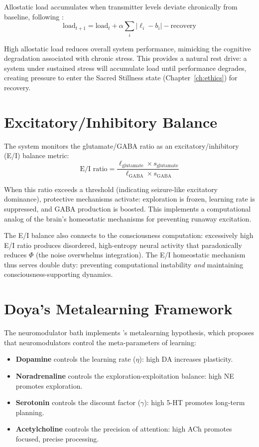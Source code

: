 \documentclass[12pt]{book}
\begin{document}
Allostatic load accumulates when transmitter levels deviate chronically from baseline, following \citet{mcewen1998}:
\begin{equation}\label{eq:allostatic}
\text{load}_{t+1} = \text{load}_t + \alpha \sum_i |\ell_i - b_i| - \text{recovery}
\end{equation}

High allostatic load reduces overall system performance, mimicking the cognitive degradation associated with chronic stress. This provides a natural rest drive: a system under sustained stress will accumulate load until performance degrades, creating pressure to enter the Sacred Stillness state (Chapter~\ref{ch:ethics}) for recovery.

\section{Excitatory/Inhibitory Balance}

The system monitors the glutamate/GABA ratio as an excitatory/inhibitory (E/I) balance metric:
\begin{equation}
\text{E/I ratio} = \frac{\ell_{\text{glutamate}} \times s_{\text{glutamate}}}{\ell_{\text{GABA}} \times s_{\text{GABA}}}
\end{equation}

When this ratio exceeds a threshold (indicating seizure-like excitatory dominance), protective mechanisms activate: exploration is frozen, learning rate is suppressed, and GABA production is boosted. This implements a computational analog of the brain's homeostatic mechanisms for preventing runaway excitation.

The E/I balance also connects to the consciousness computation: excessively high E/I ratio produces disordered, high-entropy neural activity that paradoxically reduces $\Phi$ (the noise overwhelms integration). The E/I homeostatic mechanism thus serves double duty: preventing computational instability \textit{and} maintaining consciousness-supporting dynamics.

\section{Doya's Metalearning Framework}

The neuromodulator bath implements \citet{doya2002metalearning}'s metalearning hypothesis, which proposes that neuromodulators control the meta-parameters of learning:

\begin{itemize}
  \item \textbf{Dopamine} controls the learning rate ($\eta$): high DA increases plasticity.
  \item \textbf{Noradrenaline} controls the exploration-exploitation balance: high NE promotes exploration.
  \item \textbf{Serotonin} controls the discount factor ($\gamma$): high 5-HT promotes long-term planning.
  \item \textbf{Acetylcholine} controls the precision of attention: high ACh promotes focused, precise processing.
\end{itemize}
\end{document}
